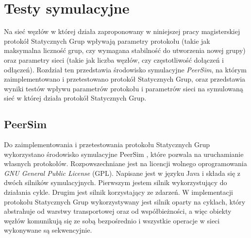 \documentclass[12pt, twoside, openany]{report}
\begin{document}







\chapter{Testy symulacyjne}

Na sieć węzłów w której działa zaproponowany w niniejszej pracy magisterskiej protokół Statycznych Grup wpływają parametry protokołu (takie jak maksymalna liczność grup, czy wymagana stabilność do utworzenia nowej grupy) oraz parametry sieci (takie jak liczba węzłów, czy częstotliwość dołączeń i odłączeń). Rozdział ten przedstawia środowisko symulacyjne \textit{PeerSim}, na którym zaimplementowano i przetestowano protokół Statycznych Grup, oraz przedstawia wyniki testów wpływu parametrów protokołu i parametrów sieci na symulowaną sieć w której działa protokół Statycznych Grup.

\section{PeerSim}

Do zaimplementowania i przetestowania protokołu Statycznych Grup wykorzystano środowisko symulacyjne PeerSim \cite{bib:peersim}, które pozwala na uruchamianie własnych protokołów. Rozpowszechniane jest na licencji wolnego oprogramowania \textit{GNU General Public License} (GPL). Napisane jest w języku Java i składa się z dwóch silników symulacyjnych. Pierwszym jestem silnik wykorzystujący do działania cykle. Drugim jest silnik korzystający ze zdarzeń. W implementacji protokołu Statycznych Grup wykorzystywany jest silnik oparty na cyklach, który abstrahuje od warstwy transportowej oraz od współbieżności, a więc obiekty węzłów komunikują się ze sobą bezpośrednio i wszystkie operacje w sieci wykonywane są sekwencyjnie.
\end{document}
